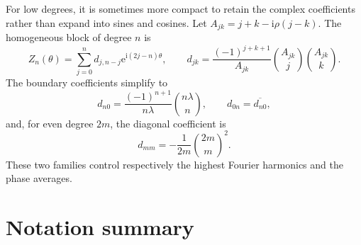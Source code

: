 \documentclass[11pt,oneside]{article}
\theoremstyle{plain}
\theoremstyle{definition}
\theoremstyle{remark}
\newcommand{\e}{\mathrm{e}}
\newcommand{\ii}{\mathrm{i}}
\begin{document}
For low degrees, it is sometimes more compact to retain the complex
coefficients rather than expand into sines and cosines.  Let
\(A_{jk}=j+k-\ii\rho(j-k)\).  The homogeneous block of degree \(n\) is
\begin{equation}
 Z_n(\theta)=\sum_{j=0}^nd_{j,n-j}\e^{\ii(2j-n)\theta},
 \qquad
 d_{jk}=\frac{(-1)^{j+k+1}}{A_{jk}}
 \binom{A_{jk}}j\binom{A_{jk}}k.
 \label{eq:appendix-d-table-master}
\end{equation}
The boundary coefficients simplify to
\begin{equation}
 d_{n0}=\frac{(-1)^{n+1}}{n\lambda}\binom{n\lambda}{n},
 \qquad
 d_{0n}=\overline{d_{n0}},
 \label{eq:boundary-coefficients}
\end{equation}
and, for even degree \(2m\), the diagonal coefficient is
\begin{equation}
 d_{mm}=-\frac1{2m}\binom{2m}{m}^2.
 \label{eq:diagonal-coefficient}
\end{equation}
These two families control respectively the highest Fourier harmonics and the
phase averages.

\section{Notation summary}
\label{app:notation}
\end{document}
